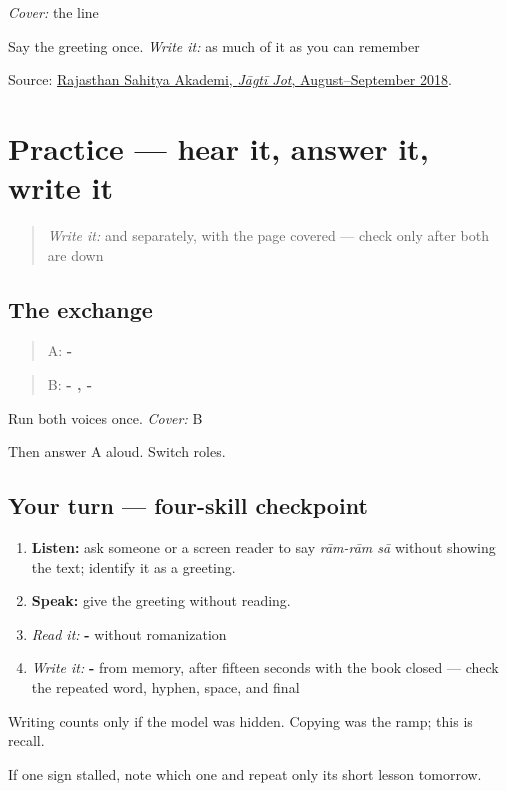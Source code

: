 \begin{tcolorbox}[breakable,colback=teal!4,colframe=teal!35!black,title={Before you move on}]
\emph{Cover:} the line

Say the greeting once. \emph{Write it:} as much of it as you can remember

Source: \href{https://rsad.artandculture.rajasthan.gov.in/content/dam/doitassets/art-and-culture/Rajasthani-Bhasha-Sahitya-Avm-Sanskriti-Academy-Bikaner/pdf/jjpdf/JJ\_All\_Pdf/August-September\%202018\%20E-Ank.pdf}{Rajasthan Sahitya Akademi, \emph{Jāgtī Jot}, August–September 2018}.
\end{tcolorbox}
\section[Practice]{Practice — hear it, answer it, write it}

\label{lesson:MW-C01-practice}



\begin{quote}
\emph{Write it:} \textbf{} and \textbf{} separately, with the page covered — check only after both are down
\end{quote}

\subsection*{The exchange}
\begin{quote}
A: \textbf{- }
\end{quote}

\begin{quote}
B: \textbf{- , -}
\end{quote}

Run both voices once. \emph{Cover:} B

Then answer A aloud. Switch roles.

\subsection*{Your turn — four-skill checkpoint}
\begin{enumerate}
\raggedright
  \item \textbf{Listen:} ask someone or a screen reader to say \emph{rām-rām sā} without showing the text; identify it as a greeting.
  \item \textbf{Speak:} give the greeting without reading.
  \item \emph{Read it:} \textbf{- } without romanization
  \item \emph{Write it:} \textbf{- } from memory, after fifteen seconds with the book closed — check the repeated word, hyphen, space, and final \textbf{}
\end{enumerate}

Writing counts only if the model was hidden. Copying was the ramp; this is recall.

\begin{tcolorbox}[breakable,colback=teal!4,colframe=teal!35!black,title={Before you move on}]
If one sign stalled, note which one and repeat only its short lesson tomorrow.
\end{tcolorbox}
